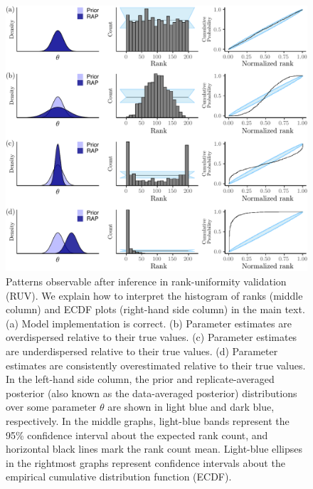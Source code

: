 \documentclass[oneside]{article}
\begin{document}
\begin{figure}
  \includegraphics[width=\linewidth]{../figures/sbc_conceptual_manual.pdf}
  \caption{
    Patterns observable after inference in rank-uniformity validation (RUV).
    We explain how to interpret the histogram of ranks (middle column) and ECDF plots (right-hand side column) in the main text.
    (a) Model implementation is correct.
    (b) Parameter estimates are overdispersed relative to their true values.
    (c) Parameter estimates are underdispersed relative to their true values.
    (d) Parameter estimates are consistently overestimated relative to their true values.
    In the left-hand side column, the prior and replicate-averaged posterior (also known as the data-averaged posterior) distributions over some parameter $\theta$ are shown in light blue and dark blue, respectively.
    In the middle graphs, light-blue bands represent the 95\% confidence interval about the expected rank count, and horizontal black lines mark the rank count mean.
    Light-blue ellipses in the rightmost graphs represent confidence intervals about the empirical cumulative distribution function (ECDF).
  }
  \label{fig:ruv_conceptual}
\end{figure}
\end{document}
